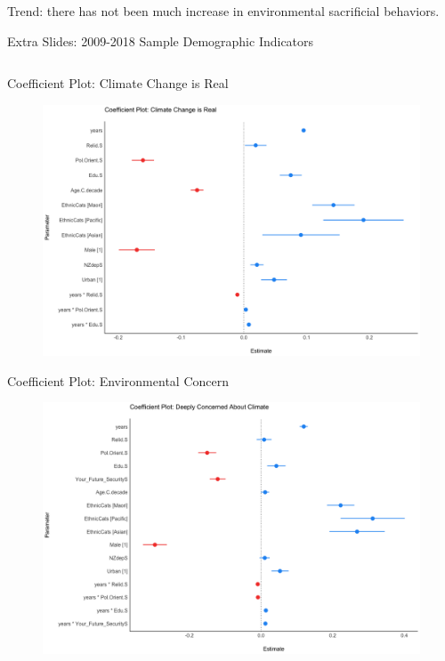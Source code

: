 \documentclass{beamer}
\begin{document}
\begin{frame}{Trend: there has not been much increase in environmental sacrificial behaviors.}
\begin{frame}{Extra Slides: 2009-2018 Sample Demographic Indicators}
\begin{table}
{\begin{tabular}{ l c c c c c c c c c c }
\end{tabular}
}
\end{table}

\end{frame}


\begin{frame}{Coefficient Plot: Climate Change is Real}
\begin{figure}
\includegraphics[width=.99\textwidth,height=\textheight,keepaspectratio]{Figures/mREAL.png}
\end{figure}
\end{frame}

\begin{frame}{Coefficient Plot: Environmental Concern}
\begin{figure}
\includegraphics[width=.99\textwidth,height=\textheight,keepaspectratio]{Figures/mCONCERN.png}
\end{figure}
\end{frame}



\end{frame}
\end{document}

